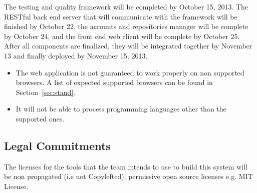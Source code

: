 The testing and quality framework will be completed by October 15, 2013. The
RESTful back end server that will communicate with the framework will be
finished by October 22, the accounts and repositories manager will be complete
by October 24, and the front end web client will be complete by October 25.
After all components are finalized, they will be integrated together by November
13 and finally deployed by November 15, 2013.

\begin{itemize}
\item The web application is not guaranteed to work properly on non supported
browsers. A list of expected supported browsers can be found in Section~\ref{sec:stand}.
\item It will not be able to process programming languages other than the
supported ones.
\end{itemize}

\subsection{Legal Commitments}

The licenses for the tools that the team intends to use to build this system
will be non propagated (i.e not Copylefted), permissive open source licenses
e.g. MIT License.